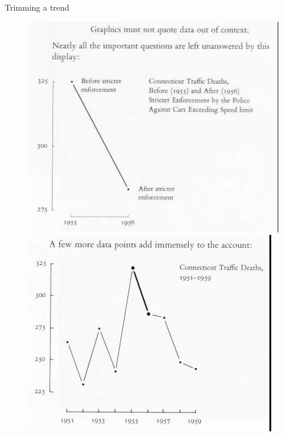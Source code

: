 \documentclass[12pt,english,pdf,dvipsnames,handout]{beamer}
\begin{document}
\begin{frame}{Trimming a trend}

\begin{figure}
  \centering
  \includegraphics[scale=0.35]{../04-graphs/14_Traffic_deaths_1}
  \includegraphics[scale=0.35]{../04-graphs/15_Traffic_deaths_2}
\end{figure}

\end{frame}
\end{document}
